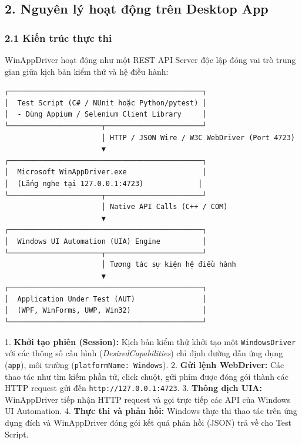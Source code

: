\subsection{2. Nguyên lý hoạt động trên Desktop App}

\subsubsection{2.1 Kiến trúc thực thi}
WinAppDriver hoạt động như một REST API Server độc lập đóng vai trò trung gian giữa kịch bản kiểm thử và hệ điều hành:

\begin{lstlisting}
┌──────────────────────────────────────────────┐
│  Test Script (C# / NUnit hoặc Python/pytest) │
│  - Dùng Appium / Selenium Client Library     │
└──────────────────────┬───────────────────────┘
                       │ HTTP / JSON Wire / W3C WebDriver (Port 4723)
                       ▼
┌──────────────────────────────────────────────┐
│  Microsoft WinAppDriver.exe                  │
│  (Lắng nghe tại 127.0.0.1:4723)             │
└──────────────────────┬───────────────────────┘
                       │ Native API Calls (C++ / COM)
                       ▼
┌──────────────────────────────────────────────┐
│  Windows UI Automation (UIA) Engine          │
└──────────────────────┬───────────────────────┘
                       │ Tương tác sự kiện hệ điều hành
                       ▼
┌──────────────────────────────────────────────┐
│  Application Under Test (AUT)                │
│  (WPF, WinForms, UWP, Win32)                 │
└──────────────────────────────────────────────┘
\end{lstlisting}


1. \textbf{Khởi tạo phiên (Session):} Kịch bản kiểm thử khởi tạo một \texttt{WindowsDriver} với các thông số cấu hình (\textit{DesiredCapabilities}) chỉ định đường dẫn ứng dụng (\texttt{app}), môi trường (\texttt{platformName: Windows}).
2. \textbf{Gửi lệnh WebDriver:} Các thao tác như tìm kiếm phần tử, click chuột, gửi phím được đóng gói thành các HTTP request gửi đến \texttt{http://127.0.0.1:4723}.
3. \textbf{Thông dịch UIA:} WinAppDriver tiếp nhận HTTP request và gọi trực tiếp các API của Windows UI Automation.
4. \textbf{Thực thi và phản hồi:} Windows thực thi thao tác trên ứng dụng đích và WinAppDriver đóng gói kết quả phản hồi (JSON) trả về cho Test Script.

